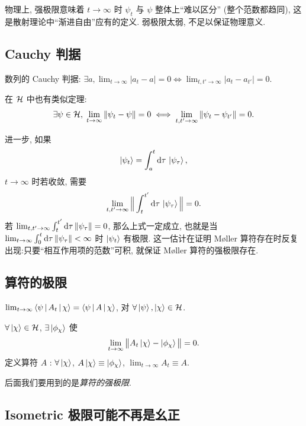 物理上, 强极限意味着 $t\to\infty$ 时 $\psi_t$ 与 $\psi$ 整体上``难以区分'' (整个范数都趋同), 这是散射理论中``渐进自由''应有的定义. 弱极限太弱, 不足以保证物理意义.

\subsection{Cauchy 判据}

数列的 Cauchy 判据: $\exists a, \lim_{t\to\infty}|a_t-a|=0\Leftrightarrow \lim_{t,t'\to\infty}|a_t-a_{t'}|=0$.

在 $\mathcal{H}$ 中也有类似定理:
\begin{equation}
\exists \psi\in\mathcal{H},\;\lim_{t\to\infty}\|\psi_t-\psi\|=0\;\Longleftrightarrow\;\lim_{t,t'\to\infty}\|\psi_t-\psi_{t'}\|=0.
\end{equation}

进一步, 如果
\begin{equation}\label{eq:integral-state}
\ket{\psi_t}=\int_a^t\mathrm{d}\tau\,\ket{\psi_\tau},
\end{equation}
$t\to\infty$ 时若收敛, 需要
\[\lim_{t,t'\to\infty}\Big\|\int_t^{t'}\mathrm{d}\tau\,\ket{\psi_\tau}\Big\|=0.\]
若 $\lim_{t,t'\to\infty}\int_t^{t'}\mathrm{d}\tau\,\|\psi_\tau\|=0$, 那么上式一定成立, 也就是当 $\lim_{t\to\infty}\int_0^t\mathrm{d}\tau\,\|\psi_\tau\|<\infty$ 时 $\ket{\psi_t}$ 有极限. 这一估计在证明 M\o ller 算符存在时反复出现:只要``相互作用项的范数''可积, 就保证 M\o ller 算符的强极限存在.

\subsection{算符的极限}

\begin{definition}[算符的弱收敛]
$\lim_{t\to\infty}\left\langle \psi \,\middle|\, A_t \,\middle|\, \chi \right\rangle=\left\langle \psi \,\middle|\, A \,\middle|\, \chi \right\rangle$, 对 $\forall \ket\psi,\ket\chi\in\mathcal{H}$.
\end{definition}

\begin{definition}[算符的强收敛]
$\forall \ket\chi\in\mathcal{H}$, $\exists\ket{\phi_\chi}$ 使
\begin{equation}
\lim_{t\to\infty}\big\|A_t\ket\chi-\ket{\phi_\chi}\big\|=0.
\end{equation}
定义算符 $A$ : $\forall \ket\chi$, $A\ket\chi\equiv \ket{\phi_\chi}$, $\lim_{t\to\infty}A_t\equiv A$.
\end{definition}

后面我们要用到的是\emph{算符的强极限}.

\subsection{Isometric 极限可能不再是幺正}


